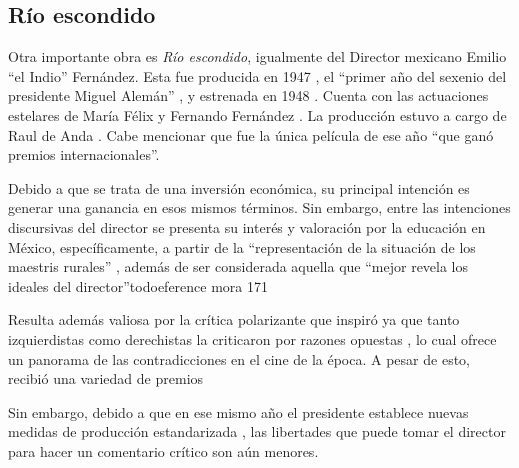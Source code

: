 \subsection{Río escondido}
Otra importante obra es \textit{Río escondido}, igualmente del Director mexicano Emilio ``el Indio'' Fernández. Esta fue producida en 1947 %
, el ``primer año del sexenio del presidente Miguel Alemán''
, y estrenada en 1948 %
. Cuenta con las actuaciones estelares de María Félix y Fernando Fernández %
. La producción estuvo a cargo de Raul de Anda %
. Cabe mencionar que fue la única película de ese año ``que ganó premios internacionales''. %

Debido a que se trata de una inversión económica, su principal intención es generar una ganancia en esos mismos términos. Sin embargo, entre las intenciones discursivas del director se presenta su interés y valoración por la educación en México, específicamente, a partir de la ``representación  de la situación de los maestris rurales'' %
, además de ser considerada aquella que ``mejor revela los ideales del director''todo{eference mora 171}

Resulta además valiosa por la crítica polarizante que inspiró %
ya que tanto izquierdistas como derechistas la criticaron por razones opuestas %
, lo cual ofrece un panorama de las contradicciones en el cine de la época.
A pesar de esto, recibió una variedad de premios %

Sin embargo, debido a que en ese mismo año el presidente establece nuevas medidas de producción estandarizada%
, las libertades que puede tomar el director para hacer un comentario crítico son aún menores.

\pagebreak
